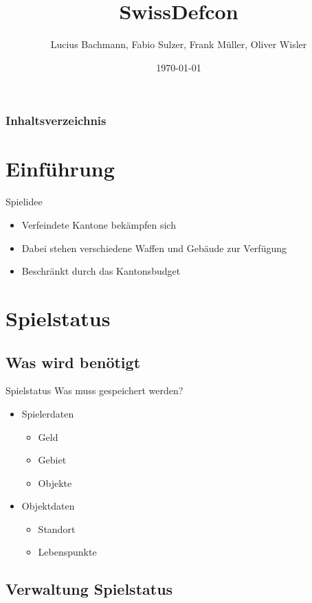 \documentclass[12pt, utf8]{beamer}
\author{Lucius Bachmann, Fabio Sulzer, Frank Müller, Oliver Wisler}
\title{SwissDefcon}
\date{\today}
\begin{document}
\begin{frame}
\titlepage
\end{frame}

\begin{frame}
	\frametitle{Inhaltsverzeichnis}
	\tableofcontents
\end{frame}


\section{Einführung}
\begin{frame}{Spielidee}
\begin{itemize}
\item Verfeindete Kantone bekämpfen sich
\item Dabei stehen verschiedene Waffen und Gebäude zur Verfügung
\item Beschränkt durch das Kantonsbudget
\end{itemize}
\end{frame}

\section{Spielstatus}

\subsection{Was wird benötigt}
\begin{frame}{Spielstatus}
Was muss gespeichert werden?
\begin{multicols}{2}
\begin{itemize}
\item  Spielerdaten 
	\begin{itemize}
		\item Geld
		\item Gebiet
		\item Objekte
	\end{itemize}
\item Objektdaten
	\begin{itemize}
		\item Standort
		\item Lebenspunkte
	\end{itemize}
\end{itemize}
\end{multicols}
\end{frame}

\subsection{Verwaltung Spielstatus}
\end{document}
